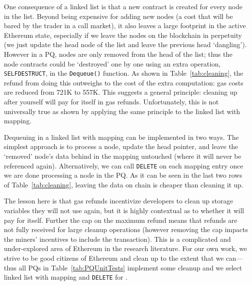 

One consequence of a linked list is that a new contract is created for every node in the list. Beyond being expensive for adding new nodes (a cost that will be bared by the trader in a call market), it also leaves a large footprint in the active Ethereum state, especially if we leave the nodes on the blockchain in perpetuity (\ie we just update the head node of the list and leave the previous head `dangling'). However in a PQ, nodes are only removed from the head of the list; thus the node contracts could be `destroyed' one by one using an extra operation, \texttt{SELFDESTRUCT}, in the \texttt{Dequeue()} function. As shown in Table~\ref{tab:cleaning}, the refund from doing this outweighs to the cost of the extra computation: gas costs are reduced from 721K to 557K.  This suggests a general principle: cleaning up after yourself will pay for itself in gas refunds. Unfortunately, this is not universally true as shown by applying the same principle to the linked list with mapping. 

Dequeuing in a linked list with mapping can be implemented in two ways. The simplest approach is to process a node, update the head pointer, and leave the `removed' node's data behind in the mapping untouched (where it will never be referenced again). Alternatively, we can call \texttt{DELETE} on each mapping entry once we are done processing a node in the PQ.  As it can be seen in the last two rows of Table~\ref{tab:cleaning}, leaving the data on chain is cheaper than cleaning it up.

The lesson here is that gas refunds incentivize developers to clean up storage variables they will not use again, but it is highly contextual as to whether it will pay for itself. Further the cap on the maximum refund means that refunds are not fully received for large cleanup operations (however removing the cap impacts the miners' incentives to include the transaction). This is a complicated and under-explored area of Ethereum in the research literature. For our own work, we strive to be good citizens of Ethereum and clean up to the extent that we can---thus all PQs in Table~\ref{tab:PQUnitTests} implement some cleanup and we select linked list with mapping and \texttt{DELETE} for \cm.



